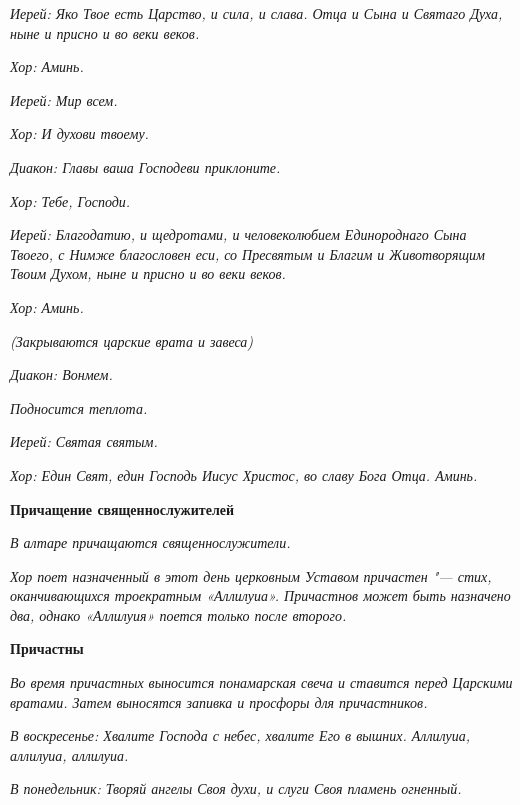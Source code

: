  \itshape Иерей:\normalfont{} Яко Твое есть Царство, и сила, и слава. Отца и Сына и Святаго
Духа, ныне и присно и во веки веков.


 \itshape Хор:\normalfont{} Аминь.


 \itshape Иерей:\normalfont{} Мир всем.


 \itshape Хор:\normalfont{} И духови твоему.


 \itshape Диакон:\normalfont{} Главы ваша Господеви приклоните.


 \itshape Хор:\normalfont{} Тебе, Господи.


 \itshape Иерей:\normalfont{} Благодатию, и щедротами, и человеколюбием Единороднаго Сына
Твоего, с Нимже благословен еси, со Пресвятым и Благим и Животворящим
Твоим Духом, ныне и присно и во веки веков.


 \itshape Хор:\normalfont{} Аминь.


 \itshape (Закрываются царские врата и завеса)\normalfont{}


 \itshape Диакон:\normalfont{} Вонмем.


 \itshape Подносится теплота.\normalfont{}


 \itshape Иерей:\normalfont{} Святая святым.


 \itshape Хор:\normalfont{} Един Свят, един Господь Иисус Христос, во славу Бога Отца.
Аминь.



 

\bfseries  Причащение священнослужителей\normalfont{}


 \itshape В алтаре причащаются священнослужители.\normalfont{}


 \itshape Хор поет назначенный в этот день церковным Уставом причастен "--- стих,
оканчивающихся троекратным «Аллилуиа». Причастнов может быть
назначено два, однако «Аллилуия» поется только после второго.\normalfont{}



 

\bfseries  Причастны\normalfont{}


 \itshape Во время причастных выносится понамарская свеча и ставится
перед Царскими вратами. Затем выносятся запивка и просфоры для
причастников.\normalfont{}


 \itshape В воскресенье:\normalfont{} Хвалите Господа с небес, хвалите Его в вышних.
Аллилуиа, аллилуиа, аллилуиа.


 \itshape В понедельник:\normalfont{} Творяй ангелы Своя духи, и слуги Своя пламень
огненный.


